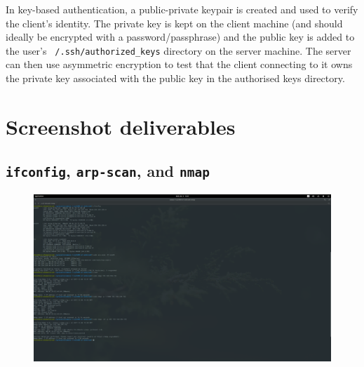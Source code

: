 \documentclass[12pt]{report}
\begin{document}
In key-based authentication, a public-private keypair is created and used to verify the client's identity. The private key is kept on the client machine (and should ideally be encrypted with a password/passphrase) and the public key is added to the user's \texttt{~/.ssh/authorized\_keys} directory on the server machine. The server can then use asymmetric encryption to test that the client connecting to it owns the private key associated with the public key in the authorised keys directory.







\begin{flushleft}
  
\end{flushleft}


\appendix

\chapter{Screenshot deliverables}
\section{\texttt{ifconfig}, \texttt{arp-scan}, and \texttt{nmap}}
\label{app:screenshots:1}
\begin{figure}[H]
  \centering
  \includegraphics[width=0.7\paperheight, angle=-90]{It's_Elementary_my_dear_Watson!-2017-12-06-13-41-10}
\end{figure}
\end{document}
